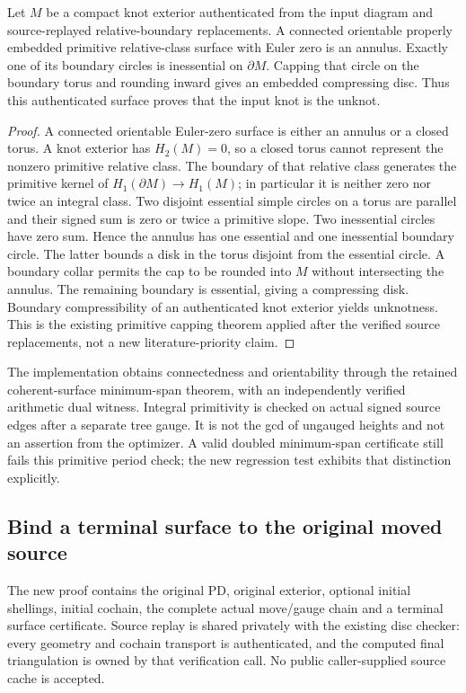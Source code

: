 \begin{proposition}
Let $M$ be a compact knot exterior authenticated from the input diagram and
source-replayed relative-boundary replacements. A connected orientable
properly embedded primitive relative-class surface with Euler zero is an
annulus. Exactly one of its boundary circles is inessential on $\partial M$.
Capping that circle on the boundary torus and rounding inward gives an
embedded compressing disc. Thus this authenticated surface proves that the
input knot is the unknot.
\end{proposition}
\begin{proof}
A connected orientable Euler-zero surface is either an annulus or a closed
torus. A knot exterior has $H_2(M)=0$, so a closed torus cannot represent
the nonzero primitive relative class. The boundary of that relative
class generates the primitive kernel of
$H_1(\partial M)\to H_1(M)$; in particular it is neither zero nor twice
an integral class. Two disjoint essential simple circles on a torus are
parallel and their signed sum is zero or twice a primitive slope. Two
inessential circles have zero sum. Hence the annulus has one essential
and one inessential boundary circle. The latter bounds a disk in the
torus disjoint from the essential circle. A boundary collar permits the
cap to be rounded into $M$ without intersecting the annulus. The remaining
boundary is essential, giving a compressing disk. Boundary compressibility
of an authenticated knot exterior yields unknotness. This is the existing
primitive capping theorem applied after the verified source replacements,
not a new literature-priority claim.
\end{proof}

The implementation obtains connectedness and orientability through the
retained coherent-surface minimum-span theorem, with an independently
verified arithmetic dual witness. Integral primitivity is checked on actual
signed source edges after a separate tree gauge. It is not the gcd of
ungauged heights and not an assertion from the optimizer. A valid doubled
minimum-span certificate still fails this primitive period check; the new
regression test exhibits that distinction explicitly.

\subsection{Bind a terminal surface to the original moved source}

The new  proof contains the original PD,
original exterior, optional initial shellings, initial cochain, the complete
actual move/gauge chain and a terminal surface certificate. Source replay
is shared privately with the existing disc checker: every geometry and
cochain transport is authenticated, and the computed final triangulation is
owned by that verification call. No public caller-supplied source cache is
accepted.

